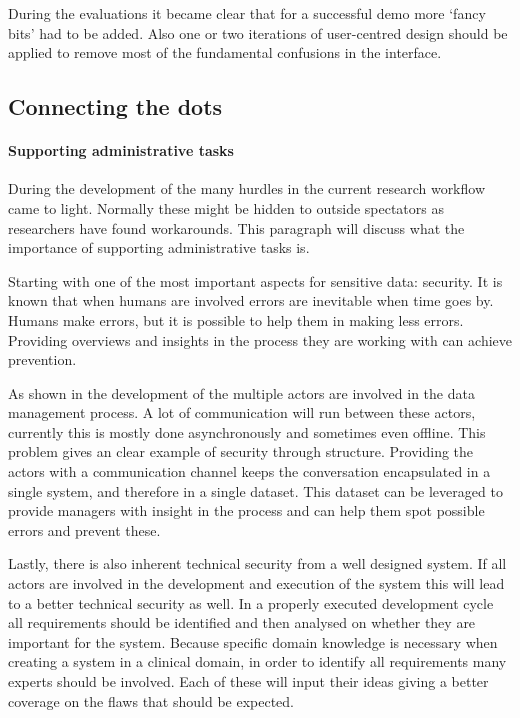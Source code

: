 During the evaluations it became clear that for a successful demo more `fancy bits' had to be added.
Also one or two iterations of user-centred design should be applied to remove most of the fundamental confusions in the interface.

\subsection{Connecting the dots}


\paragraph{Supporting administrative tasks}

During the development of the \ivfsystem{} many hurdles in the current research workflow came to light.
Normally these might be hidden to outside spectators as researchers have found workarounds.
This paragraph will discuss what the importance of supporting administrative tasks is.

Starting with one of the most important aspects for sensitive data: security.
It is known that when humans are involved errors are inevitable when time goes by.
Humans make errors, but it is possible to help them in making less errors.
Providing overviews and insights in the process they are working with can achieve prevention.

As shown in the development of the \ivfsystem{} multiple actors are involved in the data management process.
A lot of communication will run between these actors, currently this is mostly done asynchronously and sometimes even offline.
This problem gives an clear example of security through structure.
Providing the actors with a communication channel keeps the conversation encapsulated in a single system, and therefore in a single dataset.
This dataset can be leveraged to provide managers with insight in the process and can help them spot possible errors and prevent these.

Lastly, there is also inherent technical security from a well designed system.
If all actors are involved in the development and execution of the system this will lead to a better technical security as well.
In a properly executed development cycle all requirements should be identified and then analysed on whether they are important for the system.
Because specific domain knowledge is necessary when creating a system in a clinical domain, in order to identify all requirements many experts should be involved.
Each of these will input their ideas giving a better coverage on the flaws that should be expected.


